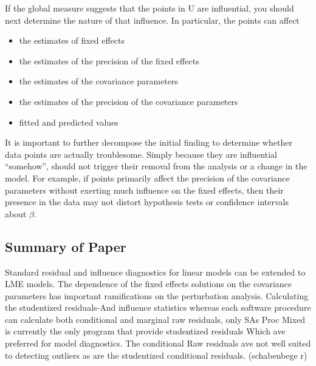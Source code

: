\documentclass[12pt, a4paper]{article}
\begin{document}
If the global measure suggests that the points in U are influential, you should next determine the nature of
that influence. In particular, the points can affect
\begin{itemize}
	\item the estimates of fixed effects
	\item the estimates of the precision of the fixed effects
	\item the estimates of the covariance parameters
	\item the estimates of the precision of the covariance parameters
	\item fitted and predicted values
\end{itemize}

It is important to further decompose the initial finding to determine whether data points are actually troublesome.
Simply because they are influential “somehow”, should not trigger their removal from the analysis or
a change in the model. For example, if points primarily affect the precision of the covariance parameters
without exerting much influence on the fixed effects, then their presence in the data may not distort hypothesis
tests or confidence intervals about $\beta$.

\subsection{Summary of Paper}

Standard residual and influence diagnostics for linear models can be extended to LME models.
The dependence of the fixed effects solutions on the covariance parameters has important ramifications on the perturbation analysis.	
Calculating the studentized residuals-And influence statistics whereas each software procedure can calculate both conditional and marginal raw residuals, only SAs Proc Mixed is currently the only program that provide studentized residuals Which ave preferred for model diagnostics. The conditional Raw residuals ave not well suited to detecting outliers as are the studentized conditional residuals. (schabenbege r)
\end{document}

